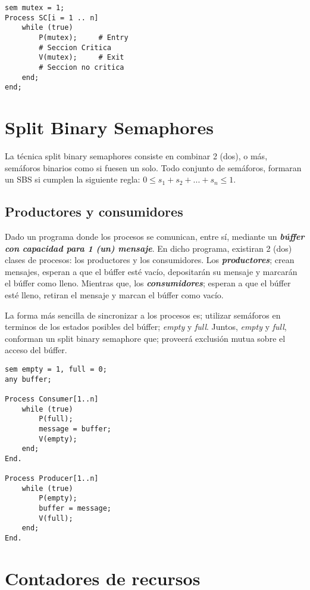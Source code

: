 \documentclass[a4paper, 11pt]{book}
\begin{document}
\begin{lstlisting}
sem mutex = 1;
Process SC[i = 1 .. n]
    while (true)
        P(mutex);     # Entry
        # Seccion Critica
        V(mutex);     # Exit
        # Seccion no critica
    end;
end;
\end{lstlisting}

\section{Split Binary Semaphores}

La técnica split binary semaphores consiste en combinar 2 (dos), o más, semáforos binarios como si fuesen un solo. Todo conjunto de semáforos, formaran un SBS si cumplen la siguiente regla: $0 \leq s_{1} + s_{2} + ... + s_{n} \leq 1$.

\subsection{Productores y consumidores}

Dado un programa donde los procesos se comunican, entre sí, mediante un \textbf{\emph{búffer con capacidad para 1 (un) mensaje}}. En dicho programa, existiran 2 (dos) clases de procesos: los productores y los consumidores. Los \textbf{\emph{productores}}; crean mensajes, esperan a que el búffer esté vacío, depositarán su mensaje y marcarán el búffer como lleno. Mientras que, los \textbf{\emph{consumidores}}; esperan a que el búffer esté lleno, retiran el mensaje y marcan el búffer como vacío.

La forma más sencilla de sincronizar a los procesos es; utilizar semáforos en terminos de los estados posibles del búffer; \emph{empty} y \emph{full}. Juntos, \emph{empty} y \emph{full}, conforman un split binary semaphore que; proveerá exclusión mutua sobre el acceso del búffer.

\begin{lstlisting}
sem empty = 1, full = 0;
any buffer;

Process Consumer[1..n]
    while (true)
        P(full);
        message = buffer;
        V(empty);
    end;
End.

Process Producer[1..n]
    while (true)
        P(empty);
        buffer = message;
        V(full);
    end;
End.
\end{lstlisting}

\section{Contadores de recursos}
\end{document}
